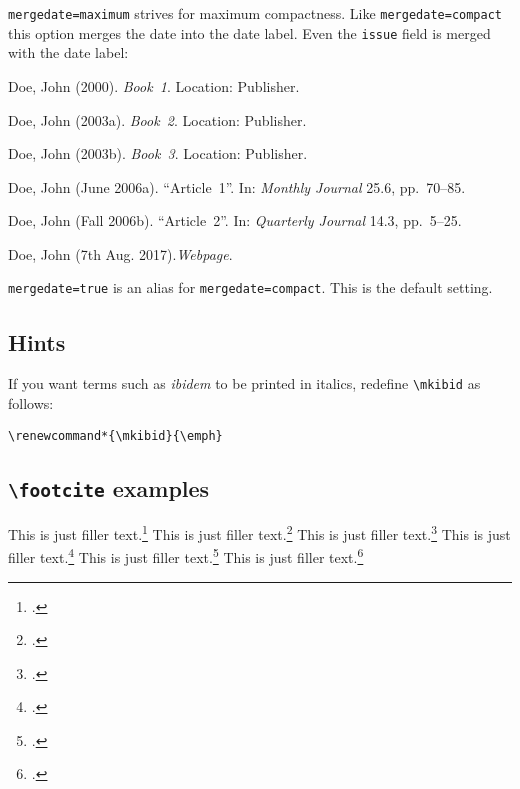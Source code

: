 \documentclass[a4paper]{article}
\newcommand{\cmd}[1]{\texttt{\textbackslash #1}}
\newenvironment{bibsample}
  {\trivlist\samepage
   \setlength{\itemsep}{0pt}}
  {\endtrivlist}
\begin{document}
\texttt{mergedate=maximum} strives for maximum compactness.
Like \texttt{mergedate=compact} this option merges the date
into the date label.
Even the \texttt{issue} field is merged with the date label:

\begin{bibsample}
\item Doe, John (2000). \emph{Book~1}. Location: Publisher.
\item Doe, John (2003a). \emph{Book~2}. Location: Publisher.
\item Doe, John (2003b). \emph{Book~3}. Location: Publisher.
\item Doe, John (June 2006a). \enquote{Article~1}. In: \emph{Monthly Journal} 25.6, pp.~70--85.
\item Doe, John (Fall 2006b). \enquote{Article~2}. In: \emph{Quarterly Journal} 14.3, pp.~5--25.
\item Doe, John (7th Aug. 2017).\emph{Webpage}.
\end{bibsample}

\texttt{mergedate=true} is an alias for \texttt{mergedate=compact}.
This is the default setting.

\subsection*{Hints}

If you want terms such as \emph{ibidem} to be printed in italics,
redefine \cmd{mkibid} as follows:

\begin{verbatim}
\renewcommand*{\mkibid}{\emph}
\end{verbatim}

\subsection*{\cmd{footcite} examples}

This is just filler text.\footcite{aristotle:physics,aristotle:poetics,aristotle:rhetoric,}
This is just filler text.\footcite{companion}
This is just filler text.\footcite{companion}
\clearpage
This is just filler text.\footcite{knuth:ct:c,knuth:ct:b,knuth:ct:d}
This is just filler text.\footcite[55]{companion}
This is just filler text.\footcite[55]{companion}

\clearpage
\printbibliography
\end{document}
